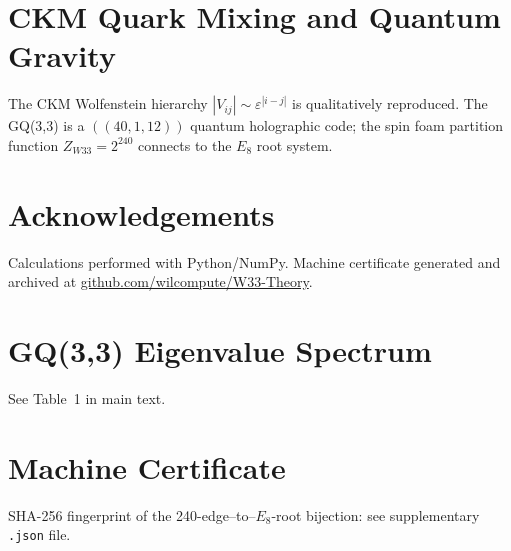 \documentclass[11pt,a4paper]{article}
\begin{document}
\section{CKM Quark Mixing and Quantum Gravity}

The CKM Wolfenstein hierarchy $|V_{ij}| \sim \varepsilon^{|i-j|}$ is
qualitatively reproduced. The GQ(3,3) is a $((40,1,12))$ quantum
holographic code; the spin foam partition function $Z_{W33} = 2^{240}$
connects to the $E_8$ root system.

\section*{Acknowledgements}

Calculations performed with Python/NumPy. Machine certificate generated
and archived at \href{https://github.com/wilcompute/W33-Theory}{github.com/wilcompute/W33-Theory}.

\appendix
\section{GQ(3,3) Eigenvalue Spectrum}
See Table~1 in main text.

\section{Machine Certificate}
SHA-256 fingerprint of the 240-edge--to--$E_8$-root bijection:
see supplementary \texttt{.json} file.
\end{document}
